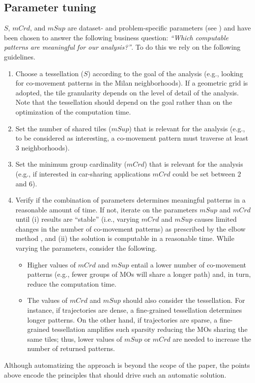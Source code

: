 \documentclass[
]{ceurart}
\begin{document}
\subsection{Parameter tuning}
$S$, $mCrd$, and $mSup$ are dataset- and problem-specific parameters (see ) and have been chosen to answer the following business question: \textit{``Which computable patterns are meaningful for our analysis?''}.
To do this we rely on the following guidelines.
\begin{enumerate}
    \item Choose a tessellation ($S$) according to the goal of the analysis (e.g., looking for co-movement patterns in the Milan neighborhoods).
    If a geometric grid is adopted, the tile granularity depends on the level of detail of the analysis.
    Note that the tessellation should depend on the goal rather than on the optimization of the computation time.
    \item Set the number of shared tiles ($mSup$) that is relevant for the analysis (e.g., to be considered as interesting, a co-movement pattern must traverse at least 3 neighborhoods).
    \item Set the minimum group cardinality ($mCrd$) that is relevant for the analysis (e.g., if interested in car-sharing applications $mCrd$ could be set between $2$ and $6$). 
    \item Verify if the combination of parameters determines meaningful patterns in a reasonable amount of time.
    If not, iterate on the parameters $mSup$ and $mCrd$ until (i) results are ``stable'' (i.e., varying $mCrd$ and $mSup$ causes limited changes in the number of co-movement patterns) as prescribed by the elbow method \citep{DBLP:conf/icdcsw/SatopaaAIR11}, and (ii) the solution is computable in a reasonable time.
    While varying the parameters, consider the following.
    \begin{itemize}
        \item Higher values of $mCrd$ and $mSup$ entail a lower number of co-movement patterns (e.g., fewer groups of MOs will share a longer path) and, in turn, reduce the computation time. 
        \item The values of $mCrd$ and $mSup$ should also consider the tessellation.
        For instance, if trajectories are dense, a fine-grained tessellation determines longer patterns.
        On the other hand, if trajectories are sparse, a fine-grained tessellation amplifies such sparsity reducing the MOs sharing the same tiles; thus, lower values of $mSup$ or $mCrd$ are needed to increase the number of returned patterns.
    \end{itemize}
\end{enumerate}
Although automatizing the approach is beyond the scope of the paper, the points above encode the principles that should drive such an automatic solution.
\end{document}
